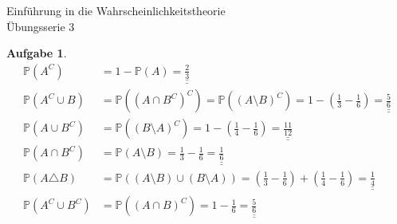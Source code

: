 \documentclass[11pt]{article}
\theoremstyle{break}
\newtheorem{task}{Aufgabe}
\begin{document}
\begin{center}
\Large{Einführung in die Wahrscheinlichkeitstheorie}\\
\large{Übungsserie 3}
\end{center}
\begin{task}
    \hfill\vspace{-5mm}
    \begin{align*}
        \mathbb{P}(A^C)             &= 1 - \mathbb{P}(A) = \underline{\underline{\frac{2}{3}}}\\
        \mathbb{P}(A^C\cup B)       &= \mathbb{P}((A\cap B^C)^C) = \mathbb{P}((A\setminus B)^C) = 1 - \left(\frac{1}{3} - \frac{1}{6}\right) = \underline{\underline{\frac{5}{6}}}\\
        \mathbb{P}(A\cup B^C)       &= \mathbb{P}((B\setminus A)^C) = 1 - \left(\frac{1}{4} - \frac{1}{6}\right) = \underline{\underline{\frac{11}{12}}}\\
        \mathbb{P}(A\cap B^C)       &= \mathbb{P}(A\setminus B) = \frac{1}{3} - \frac{1}{6} = \underline{\underline{\frac{1}{6}}}\\
        \mathbb{P}(A\triangle B)    &= \mathbb{P}((A\setminus B)\cup (B\setminus A)) = \left(\frac{1}{3} - \frac{1}{6}\right) + \left(\frac{1}{4} - \frac{1}{6}\right) = \underline{\underline{\frac{1}{4}}}\\
        \mathbb{P}(A^C\cup B^C)     &= \mathbb{P}((A\cap B)^C) = 1-\frac{1}{6} = \underline{\underline{\frac{5}{6}}}\\
    \end{align*}
\end{task}
\end{document}
